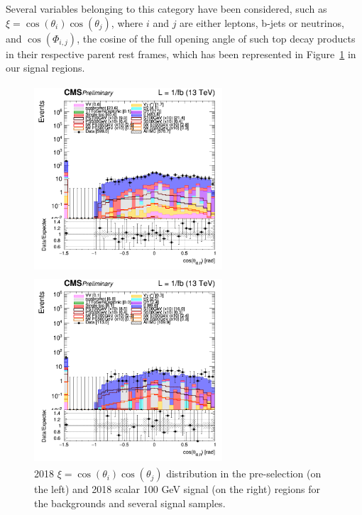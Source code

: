 \documentclass[a4paper, 10pt, openright]{report}
\begin{document}
Several variables belonging to this category have been considered, such as $\xi = \cos(\theta_i) \cos(\theta_j)$, where $i$ and $j$ are either leptons, b-jets or neutrinos, and $\cos(\Phi_{i,j})$, the cosine of the full opening angle of such top decay products in their respective parent rest frames, which has been represented in Figure~\ref{fig:SRdisc3} in our signal regions.

\begin{figure}[htbp]
\centering
\begin{minipage}[b]{.48\textwidth}
\includegraphics[width=7cm, height=7cm]{figs/log_cratio_topCR_ll_costhetall_2018.png}
\end{minipage}\hfill
\begin{minipage}[b]{.48\textwidth}
\includegraphics[width=7cm, height=7cm]{figs/log_cratio_topCR_ll_DNN_signal0_scalar100_costhetall_2018.png}
\end{minipage} \hfill
\caption{2018 $\xi = \cos(\theta_i) \cos(\theta_j)$ distribution in the pre-selection (on the left) and 2018 scalar 100 GeV signal (on the right) regions for the backgrounds and several signal samples.}
\label{fig:SRdisc3}
\end{figure}
\end{document}
